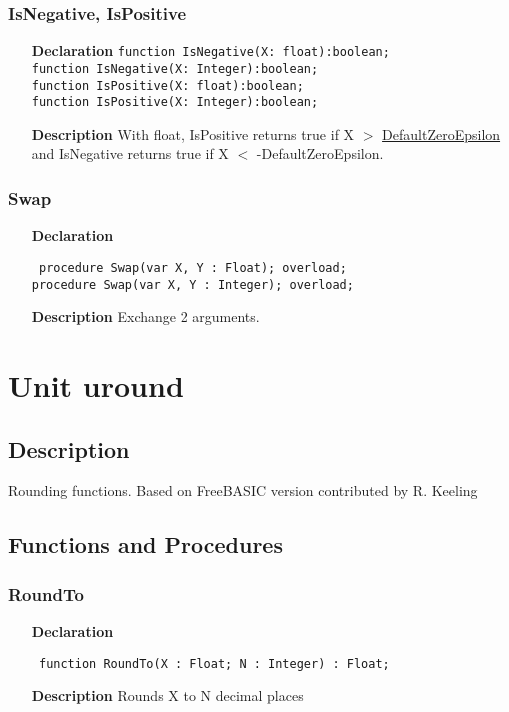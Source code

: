 \documentclass[12pt,a4paper,oneside]{report}
\newcommand{\lmath}[1]{   %
	\marginpar{\vspace{#1} 
		\begin{flushright}
			LMath
	\end{flushright} }
}
\newcommand{\declarationitem}[1]{\textbf{#1}}
\newcommand{\descriptiontitle}[1]{\textbf{#1}}
\newcommand{\code}[1]{\texttt{#1}}
\begin{document}
\subsubsection{IsNegative, IsPositive}
\begin{itemize}
	\item[\declarationitem{Declaration}\hfill]
	\code{function IsNegative(X: float):boolean;\\
	function IsNegative(X: Integer):boolean;\\
	function IsPositive(X: float):boolean;\\
	function IsPositive(X: Integer):boolean;}
	\item[\descriptiontitle{Description}]
	With float, IsPositive returns true if X $>$ \hyperref[utypes-DefaultZeroEpsilon]{DefaultZeroEpsilon} and IsNegative returns true if X $<$ -DefaultZeroEpsilon.
\end{itemize} 
\subsubsection{Swap}\lmath{-24pt}
\label{uminmax-Swap}
\begin{itemize}\item[\declarationitem{Declaration}\hfill]
	\begin{flushleft}
		\code{
			procedure Swap(var X, Y : Float); overload;\\
			procedure Swap(var X, Y : Integer); overload;}
	\end{flushleft}
	\item[\descriptiontitle{Description}]
	Exchange 2 arguments.
\end{itemize}
\section{Unit uround}
\label{uround}
\subsection{Description}
Rounding functions. Based on FreeBASIC version contributed by R. Keeling 
\subsection{Functions and Procedures}
\subsubsection{RoundTo}
\label{uround-RoundTo}
\begin{itemize}\item[\declarationitem{Declaration}\hfill]
	\begin{flushleft}
		\code{
			function RoundTo(X : Float; N : Integer) : Float;}
		
	\end{flushleft}
	
	\par
	\item[\descriptiontitle{Description}]
	Rounds X to N decimal places
	
\end{itemize}
\end{document}
